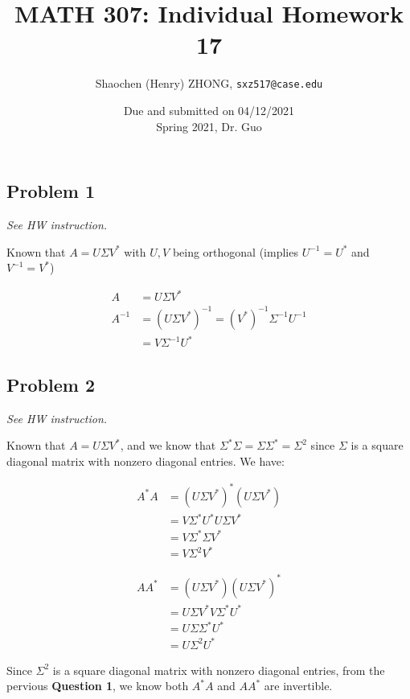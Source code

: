 \documentclass[11pt]{article}
\newcommand{\ilc}{\texttt}
\begin{document}
\title{\textbf{MATH 307: Individual Homework 17}}


\author{Shaochen (Henry) ZHONG, \ilc{sxz517@case.edu}}

\date{Due and submitted on 04/12/2021 \\ Spring 2021, Dr. Guo}
\maketitle



\subsection*{Problem 1}
\textit{See HW instruction.}\newline

Known that $A = U \Sigma V^*$ with $U, V$ being orthogonal (implies $U^{-1} = U^*$ and $V^{-1} = V^*$)

\begin{align*}
    A &= U \Sigma V^* \\
    A^{-1} &= (U \Sigma V^*)^{-1} = (V^*)^{-1} \Sigma^{-1} U^{-1} \\
    &= V \Sigma^{-1} U^*
\end{align*}


\subsection*{Problem 2}
\textit{See HW instruction.}\newline

Known that $A = U \Sigma V^*$, and we know that $\Sigma^* \Sigma = \Sigma \Sigma^* = \Sigma^2$ since $\Sigma$ is a square diagonal matrix with nonzero diagonal entries. We have:

\begin{align*}
    A^* A &= (U \Sigma V^*)^* (U \Sigma V^*) \\
    &= V \Sigma^* U^* U \Sigma V^* \\
    &= V \Sigma^* \Sigma V^* \\
    &= V \Sigma^2 V^*
\end{align*}


\begin{align*}
    AA^* &= (U \Sigma V^*) (U \Sigma V^*)^* \\
    &= U \Sigma V^* V \Sigma^* U^* \\
    &= U \Sigma \Sigma^* U^* \\
    &= U \Sigma^2 U^*
\end{align*}

Since $\Sigma^2$ is a square diagonal matrix with nonzero diagonal entries, from the pervious \textbf{Question 1}, we know both $A^* A$ and $AA^*$ are invertible.
\end{document}

